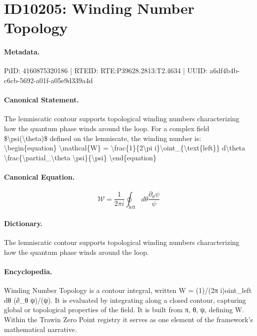 \section*{ID10205: Winding Number Topology}
\paragraph{Metadata.}
PiID: 4160875320186 | RTEID: RTE:P39628.2813:T2.4634 | UUID: a6df4b4b-c6cb-5692-a01f-a05e9d339a4d

\paragraph{Canonical Statement.}
The lemniscatic contour supports topological winding numbers characterizing how the quantum phase winds around the loop. For a complex field \$\textbackslash{}psi(\textbackslash{}theta)\$ defined on the lemniscate, the winding number is: \textbackslash{}begin\{equation\} \textbackslash{}mathcal\{W\} = \textbackslash{}frac\{1\}\{2\textbackslash{}pi i\}\textbackslash{}oint\_\{\textbackslash{}text\{left\}\} d\textbackslash{}theta \textbackslash{}frac\{\textbackslash{}partial\_\textbackslash{}theta \textbackslash{}psi\}\{\textbackslash{}psi\} \textbackslash{}end\{equation\}

\paragraph{Canonical Equation.}
\[
\mathcal{W} = \frac{1}{2\pi i}\oint_{\text{left}} d\theta \frac{\partial_\theta \psi}{\psi}
\]

\paragraph{Dictionary.}
The lemniscatic contour supports topological winding numbers characterizing how the quantum phase winds around the loop.

\paragraph{Encyclopedia.}
Winding Number Topology is a contour integral, written W = (1)/(2π i)oint\_left dθ (∂\_θ ψ)/(ψ). It is evaluated by integrating along a closed contour, capturing global or topological properties of the field. It is built from π, θ, ψ, defining W. Within the Trawin Zero Point registry it serves as one element of the framework's mathematical narrative.
